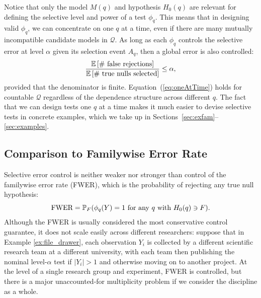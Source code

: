 \documentclass{article}
\theoremstyle{definition}
\newcommand{\cQ}{\mathcal{Q}}
\begin{document}
Notice that only the model $M(q)$ and hypothesis $H_0(q)$ are relevant for defining the selective level and power of a test $\phi_q$. This means that in designing valid $\phi_q$, we can concentrate on one $q$ at a time, even if there are many mutually incompatible candidate models in $\cQ$. As long as each $\phi_q$ controls the selective error at level $\alpha$ given its selection event $A_q$, then a global error is also controlled:
\begin{equation}\label{eq:oneAtTime}
  \frac{\E\left[\text{\# false rejections}\right]}{\E\left[\text{\# true nulls selected} \right]} \leq \alpha,
\end{equation}
provided that the denominator is finite. Equation~(\ref{eq:oneAtTime}) holds for countable $\cQ$ regardless of the dependence structure across different $q$. The fact that we can design tests one $q$ at a time makes it much easier to devise selective tests in concrete examples, which we take up in Sections~\ref{sec:exfam}--\ref{sec:examples}.

\subsection{Comparison to Familywise Error Rate}

Selective error control is neither weaker nor stronger than control of the familywise error rate (FWER), which is the probability of rejecting any true null hypothesis:
\begin{equation}
  \text{FWER} = \P_F(\phi_q(Y) = 1 \text{ for any } q \text{ with } H_0(q) \ni F).
\end{equation}
Although the FWER is usually considered the most conservative control guarantee, it does not scale easily across different researchers: suppose that in Example \ref{ex:file_drawer}, each observation $Y_i$ is collected by a different scientific research team at a different university, with each team then publishing the nominal level-$\alpha$ test if $|Y_i|>1$ and otherwise moving on to another project. At the level of a single research group and experiment, FWER is controlled, but there is a major unaccounted-for multiplicity problem if we consider the discipline as a whole.
\end{document}
